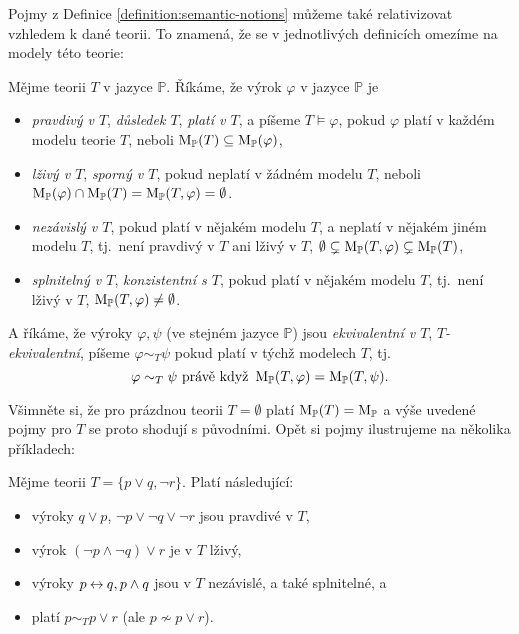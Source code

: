 Pojmy z Definice \ref{definition:semantic-notions} můžeme také relativizovat vzhledem k dané teorii. To znamená, že se v jednotlivých definicích omezíme na modely této teorie:

\begin{definition}
    Mějme teorii $T$ v jazyce $\mathbb P$. Říkáme, že výrok $\varphi$ v jazyce $\mathbb P$ je
    \begin{itemize}
        \item \emph{pravdivý v $T$}, \emph{důsledek $T$}, \emph{platí v $T$}, a píšeme $T \models \varphi$, pokud $\varphi$ platí v každém modelu teorie $T$, neboli $\operatorname{M}_\mathbb P(T)\subseteq \operatorname{M}_\mathbb P(\varphi)$,
        \item \emph{lživý v $T$}, \emph{sporný v $T$}, pokud neplatí v žádném modelu $T$, neboli $\operatorname{M}_\mathbb P(\varphi)\cap\operatorname{M}_\mathbb P(T)=\operatorname{M}_\mathbb P(T,\varphi)=\emptyset$.
        \item \emph{nezávislý v $T$}, pokud platí v nějakém modelu $T$, a neplatí v nějakém jiném modelu $T$, tj.\ není pravdivý v $T$ ani lživý v $T$, $\emptyset\subsetneq\operatorname{M}_\mathbb P(T,\varphi)\subsetneq\operatorname{M}_\mathbb P(T)$,
        \item \emph{splnitelný v $T$}, \emph{konzistentní s $T$}, pokud platí v nějakém modelu $T$, tj.\ není lživý v $T$, $\operatorname{M}_\mathbb P(T,\varphi)\neq\emptyset$.
    \end{itemize}
    A říkáme, že výroky $\varphi,\psi$ (ve stejném jazyce $\mathbb P$) jsou \emph{ekvivalentní v $T$}, \emph{$T$-ekvivalentní}, píšeme $\varphi\sim_T\psi$ pokud platí v týchž modelech $T$, tj.\
    $$
    \varphi\sim_T\psi\text{ právě když }\operatorname{M}_\mathbb P(T,\varphi)=\operatorname{M}_\mathbb P(T,\psi).
    $$
    \end{definition}

Všimněte si, že pro prázdnou teorii $T=\emptyset$ platí $\operatorname{M}_\mathbb P(T)=\operatorname{M}_\mathbb P$ a výše uvedené pojmy pro $T$ se proto shodují s původními. Opět si pojmy ilustrujeme na několika příkladech:

\begin{example} Mějme teorii $T=\{p\lor q,\neg r\}$. Platí následující:
    \begin{itemize}
        \item výroky $q\lor p$, $\neg p\lor\neg q\lor \neg r$ jsou pravdivé v $T$,
        \item výrok $(\neg p\land\neg q)\lor r$ je v $T$ lživý,
        \item výroky $p\mathbin{\leftrightarrow} q, p\land q$ jsou v $T$ nezávislé, a také splnitelné, a
        \item platí $p\sim_T p\lor r$ (ale $p\not\sim p\lor r$).
    \end{itemize}      
\end{example}


